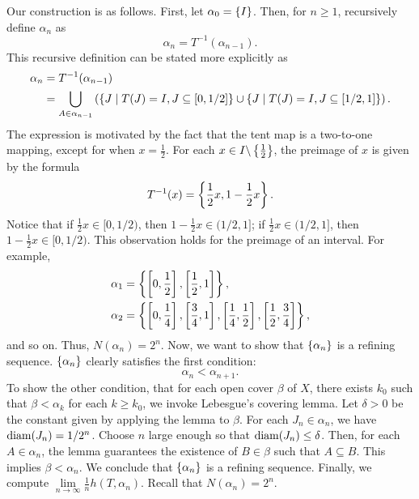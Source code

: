 \documentclass[10pt,twoside,draft]{book}
\begin{document}
Our construction is as follows.
First, let $\alpha_0 = \left \{ I \right \}$.
Then, for $n \geq 1$, recursively define $\alpha_n$ as
\begin{equation*}
  \alpha_n = T^{-1}(\alpha_{n-1}).
\end{equation*}
%
This recursive definition can be stated more explicitly as
\begin{align*}
  \alpha_n &= T^{-1}(\alpha_{n-1}) \\
  &= \bigcup\limits_{A \in \alpha_{n-1}} \left (  \left \{ J \mathrel{} \middle| \mathrel{} T(J) = I, J \subseteq [0,1/2] \right \} \cup \left \{ J \mathrel{} \middle| \mathrel{} T(J) = I, J \subseteq [1/2,1] \right \} \right ).
\end{align*}
The expression is motivated by the fact that the tent map is a two-to-one mapping, except for when $x = \frac{1}{2}$.
For each $x \in I \backslash \left \{ \frac{1}{2} \right \}$, the preimage of $x$ is given by the formula
\begin{equation*}
  T^{-1}(x) = \left \{ \frac{1}{2} x, 1 - \frac{1}{2} x \right \}.
\end{equation*}
Notice that if $\frac{1}{2} x \in [0,1/2)$, then $1 - \frac{1}{2} x \in (1/2,1]$; if $\frac{1}{2} x \in (1/2,1]$, then $1 - \frac{1}{2} x \in [0,1/2)$. %
This observation holds for the preimage of an interval.
For example,
\begin{align*}
  \alpha_1 &= \left \{ \left [ 0,\frac{1}{2} \right ], \left [ \frac{1}{2}, 1 \right ] \right \}, \\
  \alpha_2 &= \left \{ \left [ 0,\frac{1}{4} \right ], \left [ \frac{3}{4}, 1 \right ], \left [ \frac{1}{4}, \frac{1}{2} \right ], \left [ \frac{1}{2}, \frac{3}{4} \right ] \right \},
\end{align*}
and so on.
Thus, $N(\alpha_{n}) = 2^n$.
Now, we want to show that $\left \{ \alpha_n \right \}$ is a refining sequence.
$\left \{ \alpha_n \right \}$ clearly satisfies the first condition:
\begin{equation*}
  \alpha_n < \alpha_{n+1}.
\end{equation*}
To show the other condition, that for each open cover $\beta$ of $X$, there exists $k_0$ such that $\beta < \alpha_k$ for each $k \geq k_0$, we invoke Lebesgue's covering lemma.
Let $\delta > 0$ be the constant given by applying the lemma to $\beta$.
For each $J_n \in \alpha_n$, we have $\mathrm{diam}(J_n) = 1/{2^n}$.
Choose $n$ large enough so that $\mathrm{diam}(J_n) \leq \delta$.
Then, for each $A \in \alpha_n$, the lemma guarantees the existence of $B \in \beta$ such that $A \subseteq B$.
This implies $\beta < \alpha_n$.
We conclude that $\left \{ \alpha_n \right \}$ is a refining sequence.
Finally, we compute $\lim\limits_{n \to \infty} \frac{1}{n} h(T, \alpha_n)$.
Recall that $N(\alpha_{n}) = 2^n$.
\end{document}
